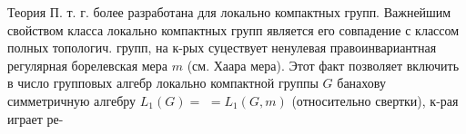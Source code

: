 \documentclass[10pt]{article}
\begin{document}
Теория П. т. г. более разработана для локально компактных групп. Важнейшим свойством класса локально компактных групп является его совпадение с классом полных топологич. групп, на к-рых суцествует ненулевая правоинвариантная регулярная борелевская мера $m$ (см. Хаара мера). Этот факт позволяет включить в число групповых алгебр локально компактной группы $G$ банахову симметричную алгебру $L_{1}(G)=$ $=L_{1}(G, m)$ (относительно свертки), к-рая играет ре-
\end{document}
